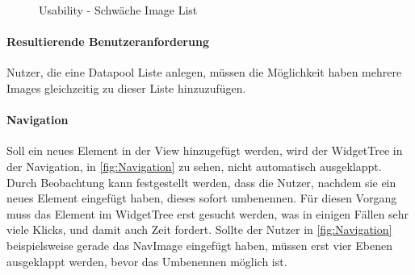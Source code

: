 \begin{figure}
 \qquad
  \caption{Usability - Schwäche Image List}%
  \label{fig:ImageList}
\end{figure}

\paragraph{Resultierende Benutzeranforderung}
Nutzer, die eine Datapool Liste anlegen, müssen die Möglichkeit haben mehrere Images gleichzeitig zu dieser Liste hinzuzufügen.


\paragraph{Navigation}
Soll ein neues Element in der View hinzugefügt werden, wird der WidgetTree in der Navigation, in \cref{fig:Navigation} zu sehen, nicht automatisch ausgeklappt.
Durch Beobachtung kann festgestellt werden, dass die Nutzer, nachdem sie ein neues Element eingefügt haben, dieses sofort umbenennen. 
Für diesen Vorgang muss das Element im WidgetTree erst gesucht werden, was in einigen Fällen sehr viele Klicks, und damit auch Zeit fordert.
Sollte der Nutzer in \cref{fig:Navigation} beispielsweise gerade das NavImage eingefügt haben, müssen erst vier Ebenen ausgeklappt werden, bevor das Umbenennen möglich ist.

